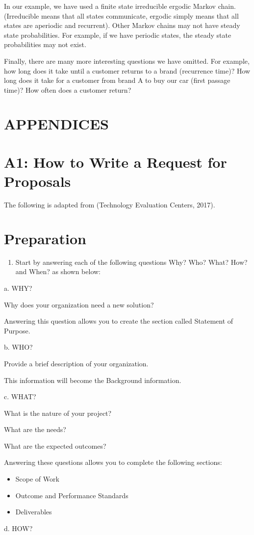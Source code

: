 \documentclass[10pt]{article}
\begin{document}
In our example, we have used a finite state irreducible ergodic Markov chain. (Irreducible means that all states communicate, ergodic simply means that all states are aperiodic and recurrent). Other Markov chains may not have steady state probabilities. For example, if we have periodic states, the steady state probabilities may not exist.

Finally, there are many more interesting questions we have omitted. For example, how long does it take until a customer returns to a brand (recurrence time)? How long does it take for a customer from brand A to buy our car (first passage time)? How often does a customer return?

\section{APPENDICES}
\section{A1: How to Write a Request for Proposals}
The following is adapted from (Technology Evaluation Centers, 2017).

\section{Preparation}
\begin{enumerate}
  \item Start by answering each of the following questions Why? Who? What? How? and When? as shown below:
\end{enumerate}
a. WHY?

Why does your organization need a new solution?

Answering this question allows you to create the section called Statement of Purpose.

b. WHO?

Provide a brief description of your organization.

This information will become the Background information.

c. WHAT?

What is the nature of your project?

What are the needs?

What are the expected outcomes?

Answering these questions allows you to complete the following sections:

\begin{itemize}
  \item Scope of Work

  \item Outcome and Performance Standards

  \item Deliverables

\end{itemize}
d. HOW?
\end{document}
